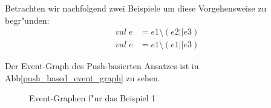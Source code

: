 Betrachten wir nachfolgend zwei Beispiele um diese Vorgehensweise zu begr"unden:
\begin{eqnarray}
val \; e & = e1 \setminus (e2 || e3)\\
val \; e & = e1 \setminus (e1 || e3)
\end{eqnarray}

Der Event-Graph des Push-basierten Ansatzes ist in
Abb\ref{push_based_event_graph} zu sehen.

\begin{figure}[htp]
\centering
{}
\caption{Event-Graphen f"ur das Beispiel 1}
\end{figure}

